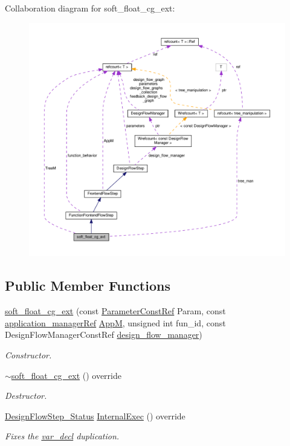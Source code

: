 Collaboration diagram for soft\+\_\+float\+\_\+cg\+\_\+ext\+:
\nopagebreak
\begin{figure}[H]
\begin{center}
\leavevmode
\includegraphics[width=350pt]{d8/d03/classsoft__float__cg__ext__coll__graph}
\end{center}
\end{figure}
\subsection*{Public Member Functions}
\begin{DoxyCompactItemize}
\item 
\hyperlink{classsoft__float__cg__ext_aab508ada521b1d4a59af2feb18ac9520}{soft\+\_\+float\+\_\+cg\+\_\+ext} (const \hyperlink{Parameter_8hpp_a37841774a6fcb479b597fdf8955eb4ea}{Parameter\+Const\+Ref} Param, const \hyperlink{application__manager_8hpp_a04ccad4e5ee401e8934306672082c180}{application\+\_\+manager\+Ref} \hyperlink{classFrontendFlowStep_a0ac0d8db2a378416583f51c4faa59d15}{AppM}, unsigned int fun\+\_\+id, const Design\+Flow\+Manager\+Const\+Ref \hyperlink{classDesignFlowStep_ab770677ddf087613add30024e16a5554}{design\+\_\+flow\+\_\+manager})
\begin{DoxyCompactList}\small\item\em Constructor. \end{DoxyCompactList}\item 
\hyperlink{classsoft__float__cg__ext_a39ecc97f210f0a6d0afa7b75e046adde}{$\sim$soft\+\_\+float\+\_\+cg\+\_\+ext} () override
\begin{DoxyCompactList}\small\item\em Destructor. \end{DoxyCompactList}\item 
\hyperlink{design__flow__step_8hpp_afb1f0d73069c26076b8d31dbc8ebecdf}{Design\+Flow\+Step\+\_\+\+Status} \hyperlink{classsoft__float__cg__ext_a74ee320b5843e7266c0111511b6aeedc}{Internal\+Exec} () override
\begin{DoxyCompactList}\small\item\em Fixes the \hyperlink{structvar__decl}{var\+\_\+decl} duplication. \end{DoxyCompactList}\end{DoxyCompactItemize}
